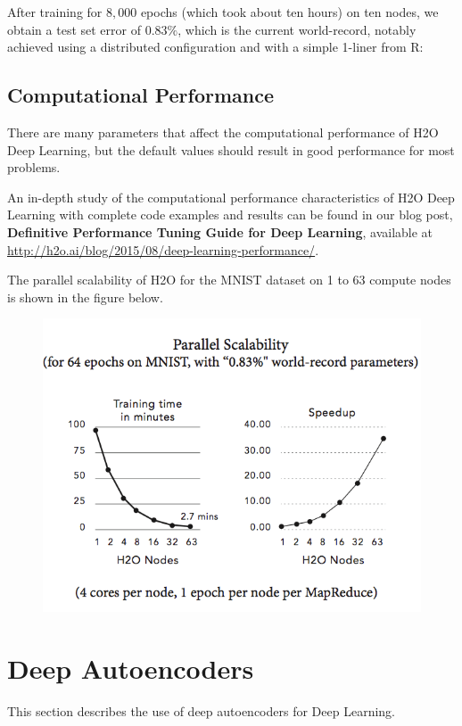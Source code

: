 {{After training for $8,000$ epochs (which took about ten hours) on ten nodes, we obtain a test set error of $0.83\%$, which is the current world-record, notably achieved using a distributed configuration and with a simple 1-liner from R:

\newpage
\waterExampleInR


\subsection{Computational Performance}
There are many parameters that affect the computational performance of H2O Deep Learning, but the default values should result in good performance for most problems. 

An in-depth study of the computational performance characteristics of H2O Deep Learning with complete code examples and results can be found in our blog post, \textbf{Definitive Performance Tuning Guide for Deep Learning}, available at \url{http://h2o.ai/blog/2015/08/deep-learning-performance/}.

The parallel scalability of H2O for the MNIST dataset on 1 to 63 compute nodes is shown in the figure below.
\begin{figure}[h!]
\centering
\includegraphics[scale=0.7]{scalability_new.png}
\end{figure}

\newpage
\section{Deep Autoencoders}
\label{sec:DeepAutoencoders}  
This section describes the use of deep autoencoders for Deep Learning. 
}}
